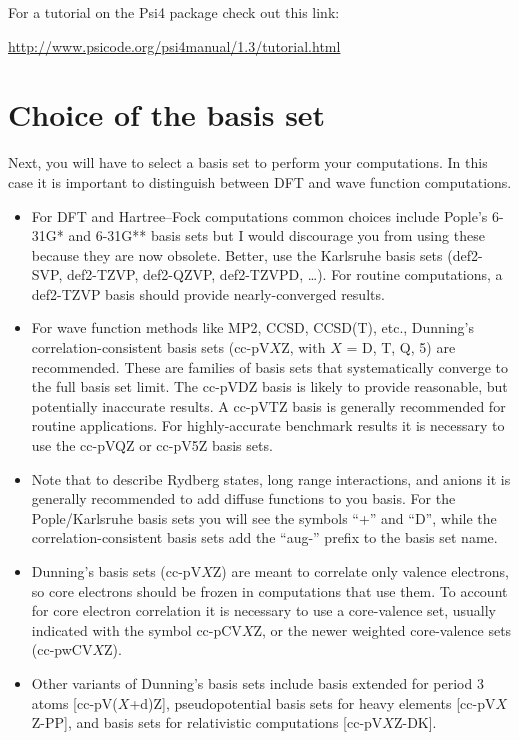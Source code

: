 \documentclass[../Main/chem532-notes.tex]{subfiles}
\begin{document}
\begin{ibox}
For a tutorial on the Psi4 package check out this link:

\url{http://www.psicode.org/psi4manual/1.3/tutorial.html}
\end{ibox}


\section{Choice of the basis set}
Next, you will have to select a basis set to perform your computations.
In this case it is important to distinguish between DFT and wave function computations.
\begin{itemize}
\item For DFT and Hartree--Fock computations common choices include Pople's 6-31G* and 6-31G** basis sets but I would discourage you from using these because they are now obsolete. Better, use the Karlsruhe basis sets (def2-SVP, def2-TZVP, def2-QZVP, def2-TZVPD, \ldots). For routine computations, a def2-TZVP basis should provide nearly-converged results.

\item For wave function methods like MP2, CCSD, CCSD(T), etc., Dunning's  correlation-consistent basis sets (cc-pV$X$Z, with $X$ = D, T, Q, 5) are recommended. These are families of basis sets that systematically converge to the full basis set limit.
The cc-pVDZ basis is likely to provide reasonable, but potentially inaccurate results. A cc-pVTZ basis is generally recommended for routine applications. 
For highly-accurate benchmark results it is necessary to use the cc-pVQZ or cc-pV5Z basis sets.

\item Note that to describe Rydberg states, long range interactions, and anions it is generally recommended to add diffuse functions to you basis. For the Pople/Karlsruhe basis sets you will see the symbols ``+'' and ``D'', while the correlation-consistent basis sets add the ``aug-'' prefix to the basis set name.

\item Dunning's basis sets (cc-pV$X$Z) are meant to correlate only valence electrons, so core electrons should be frozen in computations that use them.
To account for core electron correlation it is necessary to use a core-valence set, usually indicated with the symbol cc-pCV$X$Z, or the newer weighted core-valence sets (cc-pwCV$X$Z). 

\item Other variants of Dunning's basis sets include basis extended for period 3 atoms [cc-pV($X$+d)Z], pseudopotential basis sets for heavy elements [cc-pV$X$Z-PP], and basis sets for relativistic computations [cc-pV$X$Z-DK].

\end{itemize}
\end{document}
